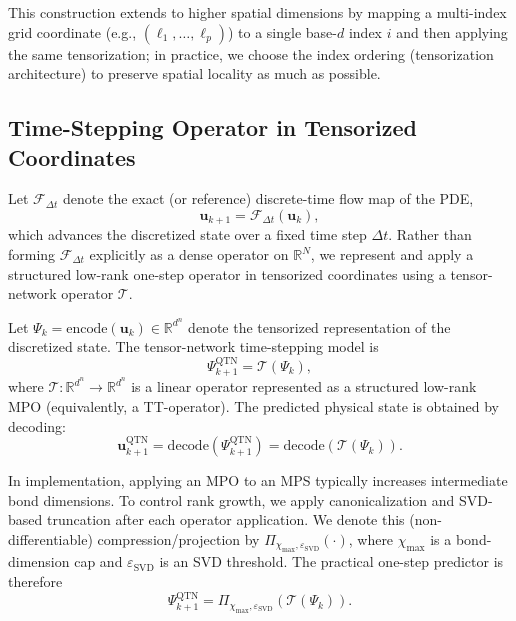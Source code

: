 \documentclass[letterpaper, 10 pt, conference]{ieeeconf}  %
\begin{document}
This construction extends to higher spatial dimensions by mapping a
multi-index grid coordinate (e.g., $(\ell_1,\dots,\ell_p)$) to a single
base-$d$ index $i$ and then applying the same tensorization; in practice, we
choose the index ordering (tensorization architecture) to preserve spatial
locality as much as possible.

\subsection{Time-Stepping Operator in Tensorized Coordinates}

Let $\mathcal{F}_{\Delta t}$ denote the exact (or reference) discrete-time flow
map of the PDE,
\begin{equation}
\mathbf{u}_{k+1} = \mathcal{F}_{\Delta t}(\mathbf{u}_k),
\end{equation}
which advances the discretized state over a fixed time step $\Delta t$.
Rather than forming $\mathcal{F}_{\Delta t}$ explicitly as a dense operator on
$\mathbb{R}^{N}$, we represent and apply a structured low-rank one-step operator
in tensorized coordinates using a tensor-network operator $\mathcal{T}$.

Let $\Psi_k = \mathrm{encode}(\mathbf{u}_k) \in \mathbb{R}^{d^n}$ denote the
tensorized representation of the discretized state. The tensor-network
time-stepping model is
\begin{equation}
\Psi_{k+1}^{\mathrm{QTN}} = \mathcal{T}(\Psi_k),
\label{eq:qtn_onestep}
\end{equation}
where $\mathcal{T} : \mathbb{R}^{d^n} \to \mathbb{R}^{d^n}$ is a linear operator
represented as a structured low-rank MPO (equivalently, a TT-operator). The
predicted physical state is obtained by decoding:
\begin{equation}
\mathbf{u}_{k+1}^{\mathrm{QTN}}
=
\mathrm{decode}\!\left(\Psi_{k+1}^{\mathrm{QTN}}\right)
=
\mathrm{decode}\!\left(\mathcal{T}(\Psi_k)\right).
\end{equation}

In implementation, applying an MPO to an MPS typically increases intermediate
bond dimensions. To control rank growth, we apply canonicalization and
SVD-based truncation after each operator application. We denote this
(non-differentiable) compression/projection by
$\Pi_{\chi_{\max},\varepsilon_{\mathrm{SVD}}}(\cdot)$, where $\chi_{\max}$ is a bond-dimension
cap and $\varepsilon_{\mathrm{SVD}}$ is an SVD threshold. The practical one-step predictor is
therefore
\begin{equation}
\Psi_{k+1}^{\mathrm{QTN}}
=
\Pi_{\chi_{\max},\varepsilon_{\mathrm{SVD}}}\!\left(\mathcal{T}(\Psi_k)\right).
\label{eq:qtn_projected}
\end{equation}
\end{document}
